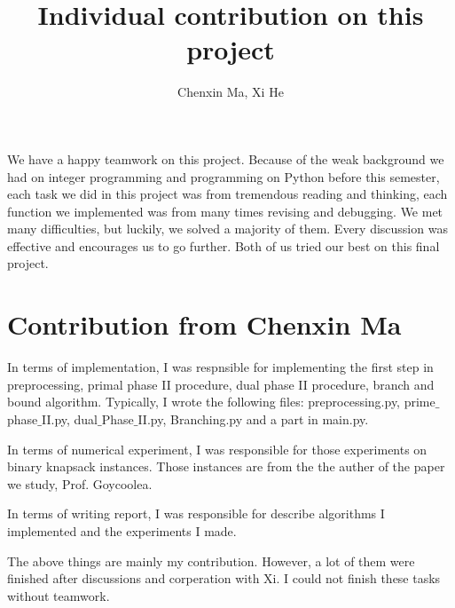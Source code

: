 \documentclass[a4paper,10pt]{article}
\title{Individual contribution on this project}
\author{Chenxin Ma, Xi He}
\begin{document}
\maketitle
 
We have a happy teamwork on this project. Because of the weak background we had on integer programming and programming on Python before this semester, each task we did in this project was from tremendous reading and thinking, each function we implemented was from many times revising and debugging. We met many difficulties, but luckily, we solved a majority of them. Every discussion was effective and encourages us to go further.  Both of us tried our best on this final project.   
 
\section{Contribution from Chenxin Ma} 

In terms of implementation, I was respnsible for implementing the first step in preprocessing, primal phase II procedure, dual phase II procedure, branch and bound algorithm. Typically, I wrote the following files: preprocessing.py, prime$\_$phase$\_$II.py, dual$\_$Phase$\_$II.py, Branching.py and a part in main.py. 

In terms of numerical experiment, I was responsible for those experiments on binary knapsack instances. Those instances are from the the auther of the paper we study, Prof. Goycoolea. 

In terms of writing report, I was responsible for describe algorithms I implemented and the experiments I made. 

The above things are mainly my contribution. However, a lot of them were finished after discussions and corperation with Xi. I could not finish these tasks without teamwork. 
 
\end{document}
